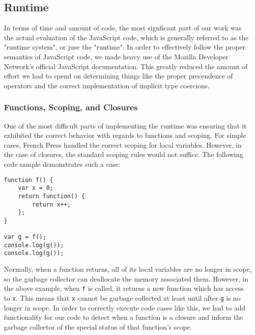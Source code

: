 \documentclass{article}
\begin{document}
\subsection*{Runtime}

In terms of time and amount of code, the most signficant part of our work was
the actual evaluation of the JavaScript code, which is generally referred to as
the "runtime system", or juse the "runtime". In order to effectively follow the
proper semantics of JavaScript code, we made heavy use of the Mozilla Developer
Network's official JavaScript
documentation\cite{mozdocs}.
This greatly reduced the amount of effort we had to spend on determining things
like the proper precendence of operators and the correct implementation of
implicit type coercions.

\subsubsection*{Functions, Scoping, and Closures}

One of the most difficult parts of implementing the runtime was ensuring that it
exhibited the correct behavior with regards to functions and scoping. For simple
cases, French Press handled the correct scoping for local variables. However,
in the case of closures, the standard scoping rules would not suffice. The
following code sample demonstrates such a case:

\vspace{3mm}

\begin{lstlisting}
function f() {
    var x = 0;
    return function() {
        return x++;
    };
}

var g = f();
console.log(g());
console.log(g());

\end{lstlisting}

\vspace{3mm}

Normally, when a function returns, all of its local variables are no longer in
scope, so the garbage collector can deallocate the memory associated them.
However, in the above example, when \texttt{f} is called, it returns a new
function which has access to \texttt{x}. This means that \texttt{x} cannot
be garbage collected at least until after \texttt{g} is no longer in scope.
In order to correctly execute code cases like this, we had to add functionality
for our code to detect when a function is a closure and inform the garbage
collector of the special status of that function's scope.
\end{document}
